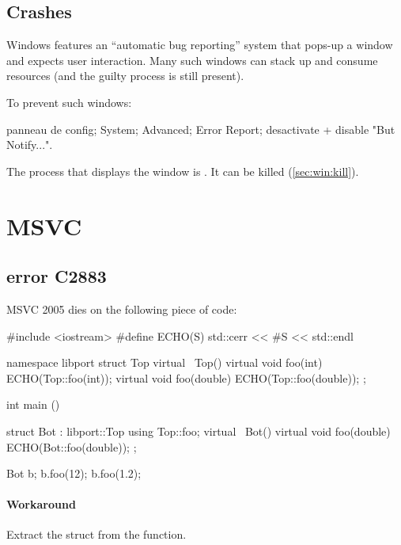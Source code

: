 \documentclass[openright,twoside,11pt]{book}
\newenvironment{workaround}{\paragraph{Workaround}}{}
\begin{document}

\subsection{Crashes}

Windows features an ``automatic bug reporting'' system that pops-up a
window and expects user interaction.  Many such windows can stack up
and consume resources (and the guilty process is still present).

To prevent such windows:

panneau de config; System; Advanced; Error Report; desactivate +
disable "But Notify...".

The process that displays the window is .  It can
be killed (\autoref{sec:win:kill}).

\section{MSVC}

\subsection{error C2883}
MSVC 2005 dies on the following piece of code:

\begin{cxx}
#include <iostream>
#define ECHO(S) std::cerr << #S << std::endl

namespace libport
{
  struct Top
  {
    virtual ~Top() {}
    virtual void foo(int)    { ECHO(Top::foo(int)); }
    virtual void foo(double) { ECHO(Top::foo(double)); }
  };
}

int
main ()
{
  struct Bot : libport::Top
  {
    using Top::foo;
    virtual ~Bot() {}
    virtual void foo(double) { ECHO(Bot::foo(double)); }
  };

  Bot b;
  b.foo(12);
  b.foo(1.2);
}
\end{cxx}


\begin{workaround}
  Extract the struct from the function.
\end{workaround}
\end{document}
